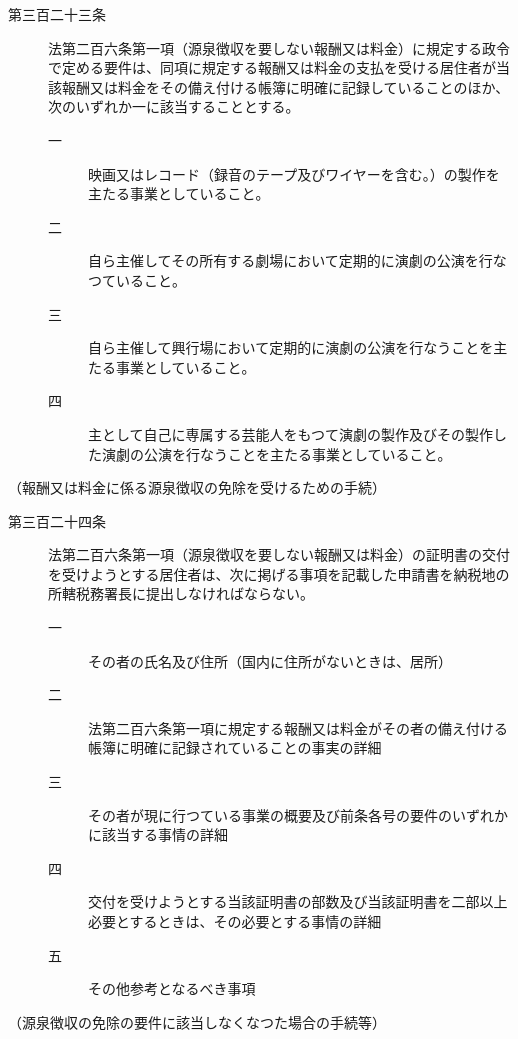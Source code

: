 \documentclass[twocolumn,a4j,10pt]{ltjtarticle}
\begin{document}
\begin{description}
\item[第三百二十三条]法第二百六条第一項（源泉徴収を要しない報酬又は料金）に規定する政令で定める要件は、同項に規定する報酬又は料金の支払を受ける居住者が当該報酬又は料金をその備え付ける帳簿に明確に記録していることのほか、次のいずれか一に該当することとする。
\begin{description}
\item[一]映画又はレコード（録音のテープ及びワイヤーを含む。）の製作を主たる事業としていること。
\item[二]自ら主催してその所有する劇場において定期的に演劇の公演を行なつていること。
\item[三]自ら主催して興行場において定期的に演劇の公演を行なうことを主たる事業としていること。
\item[四]主として自己に専属する芸能人をもつて演劇の製作及びその製作した演劇の公演を行なうことを主たる事業としていること。
\end{description}
\end{description}
\noindent\hspace{10pt}（報酬又は料金に係る源泉徴収の免除を受けるための手続）
\begin{description}
\item[第三百二十四条]法第二百六条第一項（源泉徴収を要しない報酬又は料金）の証明書の交付を受けようとする居住者は、次に掲げる事項を記載した申請書を納税地の所轄税務署長に提出しなければならない。
\begin{description}
\item[一]その者の氏名及び住所（国内に住所がないときは、居所）
\item[二]法第二百六条第一項に規定する報酬又は料金がその者の備え付ける帳簿に明確に記録されていることの事実の詳細
\item[三]その者が現に行つている事業の概要及び前条各号の要件のいずれかに該当する事情の詳細
\item[四]交付を受けようとする当該証明書の部数及び当該証明書を二部以上必要とするときは、その必要とする事情の詳細
\item[五]その他参考となるべき事項
\end{description}
\end{description}
\noindent\hspace{10pt}（源泉徴収の免除の要件に該当しなくなつた場合の手続等）
\end{document}
